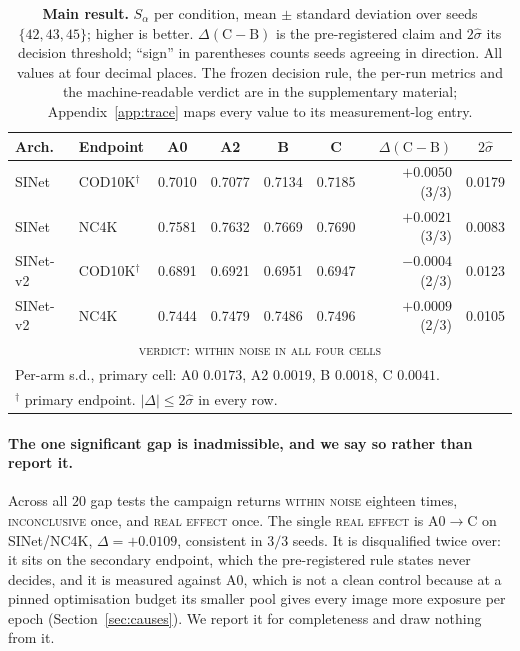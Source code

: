 \documentclass{article}
\begin{document}
\begin{table}[t]
\caption{\textbf{Main result.} $S_\alpha$ per condition, mean $\pm$ standard
deviation over seeds $\{42,43,45\}$; higher is better. $\Delta(\mathrm{C}-\mathrm{B})$
is the pre-registered claim and $2\hat{\sigma}$ its decision threshold; ``sign''
in parentheses counts seeds agreeing in direction. All values at four decimal places. The frozen
decision rule, the per-run metrics and the machine-readable verdict are in the supplementary
material; Appendix~\ref{app:trace} maps every value to its measurement-log entry.}
\label{tab:main}
\begin{center}
\footnotesize
\begin{tabular}{llccccrc}
\toprule
Arch. & Endpoint & A0 & A2 & B & C & $\Delta(\mathrm{C}-\mathrm{B})$ & $2\hat{\sigma}$ \\
\midrule
SINet    & COD10K$^\dagger$ & 0.7010 & 0.7077 & 0.7134 & 0.7185 & $+0.0050$ (3/3) & 0.0179 \\
SINet    & NC4K             & 0.7581 & 0.7632 & 0.7669 & 0.7690 & $+0.0021$ (3/3) & 0.0083 \\
SINet-v2 & COD10K$^\dagger$ & 0.6891 & 0.6921 & 0.6951 & 0.6947 & $-0.0004$ (2/3) & 0.0123 \\
SINet-v2 & NC4K             & 0.7444 & 0.7479 & 0.7486 & 0.7496 & $+0.0009$ (2/3) & 0.0105 \\
\midrule
\multicolumn{8}{c}{\textsc{verdict: within noise in all four cells}} \\
\midrule
\multicolumn{8}{l}{Per-arm s.d., primary cell: A0 $0.0173$, A2 $0.0019$, B $0.0018$, C $0.0041$.} \\
\multicolumn{8}{l}{$^\dagger$ primary endpoint. $|\Delta| \le 2\hat{\sigma}$ in every row.} \\
\bottomrule
\end{tabular}
\end{center}
\end{table}

\paragraph{The one significant gap is inadmissible, and we say so rather than report it.}
Across all $20$ gap tests the campaign returns \textsc{within noise} eighteen
times, \textsc{inconclusive} once, and \textsc{real effect} once. The single
\textsc{real effect} is $\mathrm{A0} \rightarrow \mathrm{C}$ on SINet/NC4K,
$\Delta = +0.0109$, consistent in $3/3$ seeds. It is disqualified twice over: it
sits on the secondary endpoint, which the pre-registered rule states never
decides, and it is measured against A0, which is not a clean control because at a
pinned optimisation budget its smaller pool gives every image more exposure per
epoch (Section~\ref{sec:causes}). We report it for completeness and draw nothing
from it.
\end{document}
